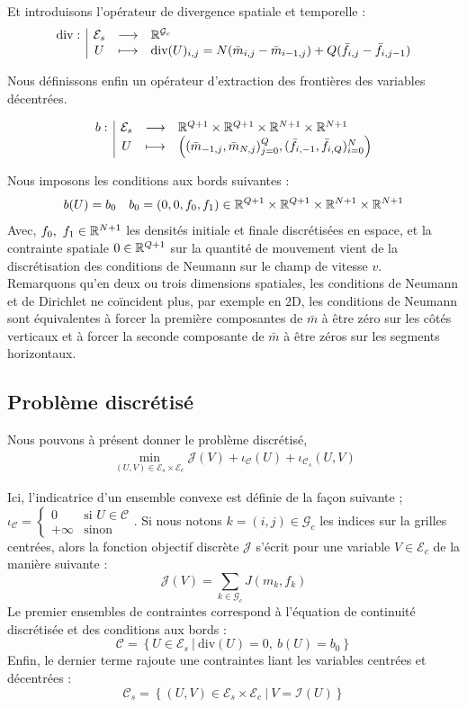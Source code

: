 \documentclass[a4paper,12pt]{article}
\renewcommand{\div}{\text{div}}
\begin{document}
Et introduisons l'opérateur de divergence spatiale et temporelle : 
\begin{align}
\fonction{\div}{\mathcal{E}_s}{\RR^{\mathcal{G}_c}}{U}{\div(U)_{i,j} = N(\bar{m}_{i,j} - \bar{m}_{i-1,j}) + Q(\bar{f}_{i,j} - \bar{f}_{i,j-1})
}
\end{align}

Nous définissons enfin un opérateur d'extraction des frontières des variables décentrées. 

\begin{align}
\begin{array}[t]{l|ccl} b: & \mathcal{E}_s & \longrightarrow & \mathbb{R}^{Q+1}\times\mathbb{R}^{Q+1}\times\mathbb{R}^{N+1}\times\mathbb{R}^{N+1} \\ & U & \longmapsto & \left( (\bar{m}_{-1,j},\bar{m}_{N,j})_{j=0}^Q,(\bar{f}_{i,-1},\bar{f}_{i,Q})_{i=0}^N \right) \end{array}
\end{align}


Nous imposons les conditions aux bords suivantes :
$$
b(U) = b_0\quad b_0=(0,0,f_0,f_1)\in \mathbb{R}^{Q+1}\times\mathbb{R}^{Q+1}\times\mathbb{R}^{N+1}\times\mathbb{R}^{N+1}
$$
Avec, $f_0,\ f_1\in\mathbb{R}^{N+1}$ les densités initiale et finale discrétisées en espace, et la contrainte spatiale $0\in\mathbb{R}^{Q+1}$ sur la quantité de mouvement vient de la discrétisation des conditions de Neumann sur le champ de vitesse $v$. \\
Remarquons qu'en deux ou trois dimensions spatiales, les conditions de Neumann et de Dirichlet ne coïncident plus,  par exemple en 2D, les conditions de Neumann sont équivalentes à forcer la première composantes de $\bar{m}$ à être zéro sur les côtés verticaux et à forcer la seconde composante de $\bar{m}$ à être zéros sur les segments horizontaux. 

\subsection{Problème discrétisé}

Nous pouvons à présent donner le problème discrétisé, 
\begin{align}
\min_{(U,V)\in\mathcal{E}_s\times\mathcal{E}_c} \mathcal{J}(V) + \iota_{\mathcal{C}}(U) + \iota_{\mathcal{C}_s}(U,V)
\end{align}

Ici, l'indicatrice d'un ensemble convexe est définie de la façon suivante ; $ \iota_{\mathcal{C}}=\left\{\begin{array}{cl}
0 &\text{si } U\in\mathcal{C} \\
+\infty &\text{sinon }
\end{array}\right.$. Si nous notons $k=(i,j)\in\mathcal{G}_c$ les indices sur la grilles centrées, alors la fonction objectif discrète $\mathcal{J}$ s'écrit pour une variable $V\in\mathcal{E}_c$  de la manière suivante : 
$$
\mathcal{J}(V)=\sum_{k\in\mathcal{G}_c} J(m_k,f_k)
$$
Le premier ensembles de contraintes correspond à l'équation de continuité discrétisée et des conditions aux bords : 
$$
\mathcal{C}= \left\{ U\in \mathcal{E}_s\ |\ \div(U)=0,\ b(U) = b_0 \right\}
$$
Enfin, le dernier terme rajoute une contraintes liant les variables centrées et décentrées : 
$$
\mathcal{C}_s=\left\{(U,V)\in\mathcal{E}_s\times\mathcal{E}_c\ |\ V=\mathcal{I}(U)\right\}
$$
\end{document}
